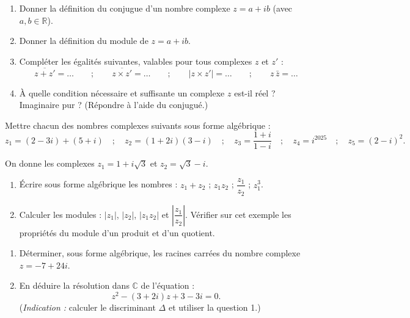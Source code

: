 \documentclass[11pt]{article}
\newcommand{\cle}[1]{{\popxbold\color{popdark}#1}}
\newcounter{popsec}
\newcounter{popsub}
\newcommand{\courssub}[1]{%
  \stepcounter{popsub}%
  \par\vspace{9pt}\noindent{\popxbold\fontsize{11.5}{13}\selectfont\color{popink}{\color{poporange}\thepopsec.\thepopsub}\hspace{6pt}#1}\par\nopagebreak\vspace{4pt}
}
\begin{document}
\begin{exercice}
\begin{enumerate}
\item Donner la définition du \cle{conjugue} d'un nombre complexe $z = a+ib$ (avec $a, b \in \mathbb{R}$).
\item Donner la définition du \cle{module} de $z = a+ib$.
\item Compléter les égalités suivantes, valables pour tous complexes $z$ et $z'$ :
\[ \overline{z+z'} = \ldots \qquad ; \qquad \overline{z \times z'} = \ldots \qquad ; \qquad |z \times z'| = \ldots \qquad ; \qquad z\,\bar{z} = \ldots \]
\item À quelle condition nécessaire et suffisante un complexe $z$ est-il réel ? Imaginaire pur ? (Répondre à l'aide du conjugué.)
\end{enumerate}
\end{exercice}

\begin{exercice}
Mettre chacun des nombres complexes suivants sous forme algébrique :
\[ z_1 = (2-3i) + (5+i) \quad ; \quad z_2 = (1+2i)(3-i) \quad ; \quad z_3 = \dfrac{1+i}{1-i} \quad ; \quad z_4 = i^{2025} \quad ; \quad z_5 = (2-i)^2. \]
\end{exercice}

\courssub{Je m'entraîne}

\begin{exercice}
On donne les complexes $z_1 = 1+i\sqrt{3}$ et $z_2 = \sqrt{3}-i$.
\begin{enumerate}
\item Écrire sous forme algébrique les nombres : $z_1 + z_2$ ; $z_1 z_2$ ; $\dfrac{z_1}{z_2}$ ; $z_1^3$.
\item Calculer les modules : $|z_1|$, $|z_2|$, $|z_1 z_2|$ et $\left|\dfrac{z_1}{z_2}\right|$. Vérifier sur cet exemple les propriétés du module d'un produit et d'un quotient.
\end{enumerate}
\end{exercice}

\begin{exercice}
\begin{enumerate}
\item Déterminer, sous forme algébrique, les racines carrées du nombre complexe $z = -7 + 24i$.
\item En déduire la résolution dans $\mathbb{C}$ de l'équation :
\[ z^2 - (3+2i)z + 3 - 3i = 0. \]
(\emph{Indication :} calculer le discriminant $\Delta$ et utiliser la question 1.)
\end{enumerate}
\end{exercice}
\end{document}
